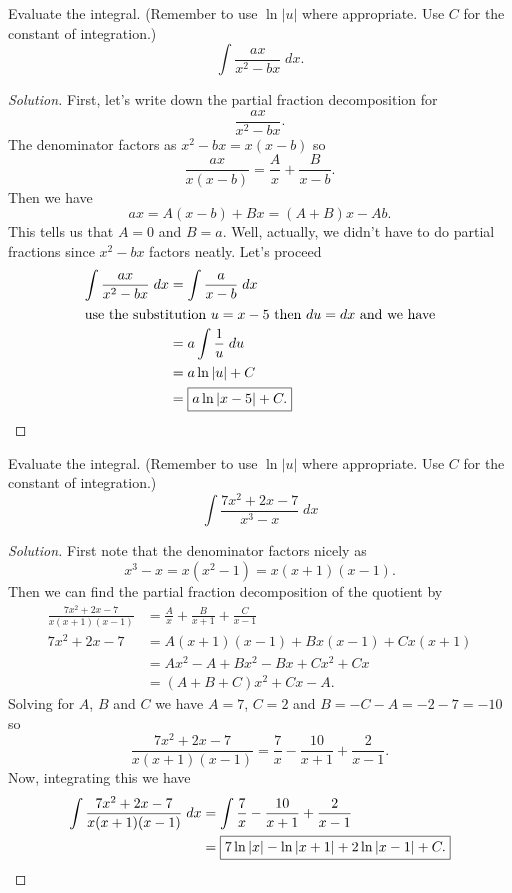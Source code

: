 \begin{problem}[WebAssign, HW 13, \# 4]
Evaluate the integral. (Remember to use $\ln|u|$ where appropriate. Use $C$
for the constant of integration.)
\[
\int\frac{ax}{x^2-bx}\;dx.
\]
\end{problem}
\begin{proof}[Solution]
First, let's write down the partial fraction decomposition for
\[
\frac{ax}{x^2-bx}.
\]
The denominator factors as $x^2-bx=x(x-b)$ so
\[
\frac{ax}{x(x-b)}=\frac{A}{x}+\frac{B}{x-b}.
\]
Then we have
\[
ax=A(x-b)+Bx=(A+B)x-Ab.
\]
This tells us that $A=0$ and $B=a$. Well, actually, we didn't have to do
partial fractions since $x^2-bx$ factors neatly. Let's proceed
\begin{align*}
\int\frac{ax}{x^2-bx}\;dx
&=\int\frac{a}{x-b}\;dx\\
\intertext{use the substitution $u=x-5$ then $du=dx$ and we have}
&=a\int\frac{1}{u}\;du\\
&=a\ln|u|+C\\
&=\boxed{a\ln|x-5|+C.}
\end{align*}
\end{proof}

\begin{problem}[WebAssign, HW 13, \# 5]
Evaluate the integral. (Remember to use $\ln|u|$ where appropriate. Use $C$
for the constant of integration.)
\[
\int\frac{7x^2+2x-7}{x^3-x}\;dx
\]
\end{problem}
\begin{proof}[Solution]
First note that the denominator factors nicely as
\[
x^3-x=x(x^2-1)=x(x+1)(x-1).
\]
Then we can find the partial fraction decomposition of the quotient by
\begin{align*}
\frac{7x^2+2x-7}{x(x+1)(x-1)}
&=\frac{A}{x}+\frac{B}{x+1}+\frac{C}{x-1}\\
7x^2+2x-7&=A(x+1)(x-1)+Bx(x-1)+Cx(x+1)\\
&=Ax^2-A+Bx^2-Bx+Cx^2+Cx\\
&=(A+B+C)x^2+Cx-A.
\end{align*}
Solving for $A$, $B$ and $C$ we have $A=7$, $C=2$ and $B=-C-A=-2-7=-10$ so
\[
\frac{7x^2+2x-7}{x(x+1)(x-1)}
=\frac{7}{x}-\frac{10}{x+1}+\frac{2}{x-1}.
\]
Now, integrating this we have
\begin{align*}
\int\frac{7x^2+2x-7}{x(x+1)(x-1)}\;dx
&=\int\frac{7}{x}-\frac{10}{x+1}+\frac{2}{x-1}\\
&=\boxed{7\ln|x|-\ln|x+1|+2\ln|x-1|+C.}\qedhere
\end{align*}
\end{proof}

